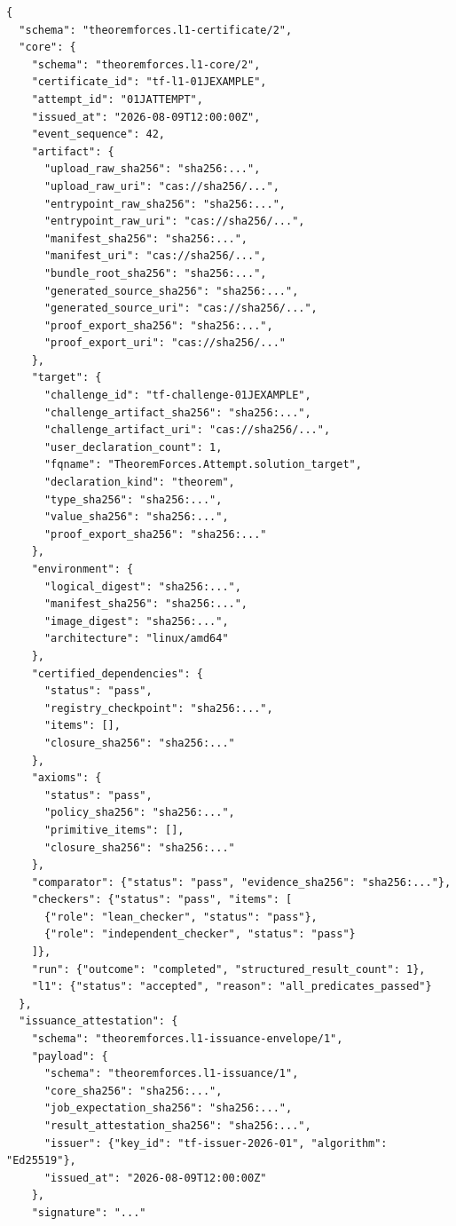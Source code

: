 \documentclass[a4paper,11pt]{ltjsarticle}
\begin{document}
\begin{lstlisting}[language={},basicstyle=\ttfamily\scriptsize,caption={Cycle-free certificate envelope topology}]
{
  "schema": "theoremforces.l1-certificate/2",
  "core": {
    "schema": "theoremforces.l1-core/2",
    "certificate_id": "tf-l1-01JEXAMPLE",
    "attempt_id": "01JATTEMPT",
    "issued_at": "2026-08-09T12:00:00Z",
    "event_sequence": 42,
    "artifact": {
      "upload_raw_sha256": "sha256:...",
      "upload_raw_uri": "cas://sha256/...",
      "entrypoint_raw_sha256": "sha256:...",
      "entrypoint_raw_uri": "cas://sha256/...",
      "manifest_sha256": "sha256:...",
      "manifest_uri": "cas://sha256/...",
      "bundle_root_sha256": "sha256:...",
      "generated_source_sha256": "sha256:...",
      "generated_source_uri": "cas://sha256/...",
      "proof_export_sha256": "sha256:...",
      "proof_export_uri": "cas://sha256/..."
    },
    "target": {
      "challenge_id": "tf-challenge-01JEXAMPLE",
      "challenge_artifact_sha256": "sha256:...",
      "challenge_artifact_uri": "cas://sha256/...",
      "user_declaration_count": 1,
      "fqname": "TheoremForces.Attempt.solution_target",
      "declaration_kind": "theorem",
      "type_sha256": "sha256:...",
      "value_sha256": "sha256:...",
      "proof_export_sha256": "sha256:..."
    },
    "environment": {
      "logical_digest": "sha256:...",
      "manifest_sha256": "sha256:...",
      "image_digest": "sha256:...",
      "architecture": "linux/amd64"
    },
    "certified_dependencies": {
      "status": "pass",
      "registry_checkpoint": "sha256:...",
      "items": [],
      "closure_sha256": "sha256:..."
    },
    "axioms": {
      "status": "pass",
      "policy_sha256": "sha256:...",
      "primitive_items": [],
      "closure_sha256": "sha256:..."
    },
    "comparator": {"status": "pass", "evidence_sha256": "sha256:..."},
    "checkers": {"status": "pass", "items": [
      {"role": "lean_checker", "status": "pass"},
      {"role": "independent_checker", "status": "pass"}
    ]},
    "run": {"outcome": "completed", "structured_result_count": 1},
    "l1": {"status": "accepted", "reason": "all_predicates_passed"}
  },
  "issuance_attestation": {
    "schema": "theoremforces.l1-issuance-envelope/1",
    "payload": {
      "schema": "theoremforces.l1-issuance/1",
      "core_sha256": "sha256:...",
      "job_expectation_sha256": "sha256:...",
      "result_attestation_sha256": "sha256:...",
      "issuer": {"key_id": "tf-issuer-2026-01", "algorithm": "Ed25519"},
      "issued_at": "2026-08-09T12:00:00Z"
    },
    "signature": "..."

\end{lstlisting}
\end{document}
